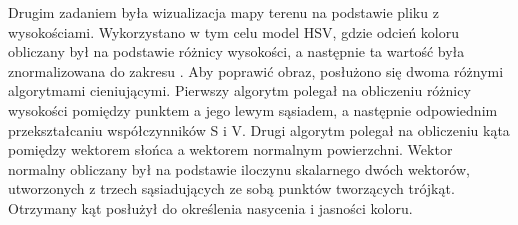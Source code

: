 \documentclass{article}
\begin{document}
Drugim zadaniem była wizualizacja mapy terenu na podstawie pliku z wysokościami. Wykorzystano w tym celu model HSV, gdzie odcień koloru obliczany był na podstawie różnicy wysokości, a następnie ta wartość była znormalizowana do zakresu \mbox{\(<0,120>\)}. Aby poprawić obraz, posłużono się dwoma różnymi algorytmami cieniującymi. Pierwszy algorytm polegał na obliczeniu różnicy wysokości pomiędzy punktem a jego lewym sąsiadem, a następnie odpowiednim przekształcaniu współczynników S i V. Drugi algorytm polegał na obliczeniu kąta pomiędzy wektorem słońca a wektorem normalnym powierzchni. Wektor normalny obliczany był na podstawie iloczynu skalarnego dwóch wektorów, utworzonych z trzech sąsiadujących ze sobą punktów tworzących trójkąt. Otrzymany kąt posłużył do określenia nasycenia i jasności koloru.


{}
\end{document}
